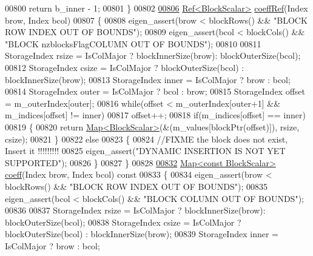 \begin{DoxyCode}
00800       \textcolor{keywordflow}{return} b\_inner - 1;
00801     \}
00802 
\hyperlink{group___sparse_core___module_af7d43390424f705f281c41a2c07db92f}{00806}     \hyperlink{group___core___module_class_eigen_1_1_ref}{Ref<BlockScalar>} \hyperlink{group___sparse_core___module_af7d43390424f705f281c41a2c07db92f}{coeffRef}(Index brow, Index bcol)
00807     \{
00808       eigen\_assert(brow < blockRows() && \textcolor{stringliteral}{"BLOCK ROW INDEX OUT OF BOUNDS"});
00809       eigen\_assert(bcol < blockCols() && \textcolor{stringliteral}{"BLOCK nzblocksFlagCOLUMN OUT OF BOUNDS"});
00810 
00811       StorageIndex rsize = IsColMajor ? blockInnerSize(brow): blockOuterSize(bcol);
00812       StorageIndex csize = IsColMajor ? blockOuterSize(bcol) : blockInnerSize(brow);
00813       StorageIndex inner = IsColMajor ? brow : bcol;
00814       StorageIndex outer = IsColMajor ? bcol : brow;
00815       StorageIndex offset = m\_outerIndex[outer];
00816       \textcolor{keywordflow}{while}(offset < m\_outerIndex[outer+1] && m\_indices[offset] != inner)
00817         offset++;
00818       \textcolor{keywordflow}{if}(m\_indices[offset] == inner)
00819       \{
00820         \textcolor{keywordflow}{return} \hyperlink{group___core___module_class_eigen_1_1_map}{Map<BlockScalar>}(&(m\_values[blockPtr(offset)]), rsize, csize);
00821       \}
00822       \textcolor{keywordflow}{else}
00823       \{
00824         \textcolor{comment}{//FIXME the block does not exist, Insert it !!!!!!!!!}
00825         eigen\_assert(\textcolor{stringliteral}{"DYNAMIC INSERTION IS NOT YET SUPPORTED"});
00826       \}
00827     \}
00828 
\hyperlink{group___sparse_core___module_aa6f4ffb07a0ef2863e7a933676a46abf}{00832}     \hyperlink{group___core___module_class_eigen_1_1_map}{Map<const BlockScalar>} \hyperlink{group___sparse_core___module_aa6f4ffb07a0ef2863e7a933676a46abf}{coeff}(Index brow, Index bcol)\textcolor{keyword}{ const}
00833 \textcolor{keyword}{    }\{
00834       eigen\_assert(brow < blockRows() && \textcolor{stringliteral}{"BLOCK ROW INDEX OUT OF BOUNDS"});
00835       eigen\_assert(bcol < blockCols() && \textcolor{stringliteral}{"BLOCK COLUMN OUT OF BOUNDS"});
00836 
00837       StorageIndex rsize = IsColMajor ? blockInnerSize(brow): blockOuterSize(bcol);
00838       StorageIndex csize = IsColMajor ? blockOuterSize(bcol) : blockInnerSize(brow);
00839       StorageIndex inner = IsColMajor ? brow : bcol;

\end{DoxyCode}
